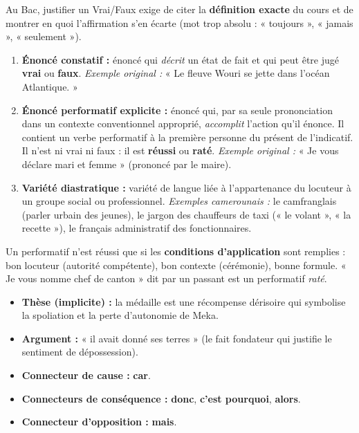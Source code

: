 \documentclass[11pt]{article}
\begin{document}
\begin{attention}
Au Bac, justifier un Vrai/Faux exige de citer la \textbf{définition exacte} du cours et de montrer en quoi l'affirmation s'en écarte (mot trop absolu : « toujours », « jamais », « seulement »).
\end{attention}

\begin{corrige}
\begin{enumerate}
    \item \textbf{Énoncé constatif :} énoncé qui \emph{décrit} un état de fait et qui peut être jugé \textbf{vrai} ou \textbf{faux}. \emph{Exemple original :} « Le fleuve Wouri se jette dans l'océan Atlantique. »
    \item \textbf{Énoncé performatif explicite :} énoncé qui, par sa seule prononciation dans un contexte conventionnel approprié, \emph{accomplit} l'action qu'il énonce. Il contient un verbe performatif à la première personne du présent de l'indicatif. Il n'est ni vrai ni faux : il est \textbf{réussi} ou \textbf{raté}. \emph{Exemple original :} « Je vous déclare mari et femme » (prononcé par le maire).
    \item \textbf{Variété diastratique :} variété de langue liée à l'appartenance du locuteur à un groupe social ou professionnel. \emph{Exemples camerounais :} le camfranglais (parler urbain des jeunes), le jargon des chauffeurs de taxi (« le volant », « la recette »), le français administratif des fonctionnaires.
\end{enumerate}
\end{corrige}

\begin{attention}
Un performatif n'est réussi que si les \textbf{conditions d'application} sont remplies : bon locuteur (autorité compétente), bon contexte (cérémonie), bonne formule. « Je vous nomme chef de canton » dit par un passant est un performatif \emph{raté}.
\end{attention}

\begin{corrige}
\begin{itemize}
    \item \textbf{Thèse (implicite) :} la médaille est une récompense dérisoire qui symbolise la spoliation et la perte d'autonomie de Meka.
    \item \textbf{Argument :} « il avait donné ses terres » (le fait fondateur qui justifie le sentiment de dépossession).
    \item \textbf{Connecteur de cause :} \textbf{car}.
    \item \textbf{Connecteurs de conséquence :} \textbf{donc}, \textbf{c'est pourquoi}, \textbf{alors}.
    \item \textbf{Connecteur d'opposition :} \textbf{mais}.
\end{itemize}
\end{corrige}
\end{document}
